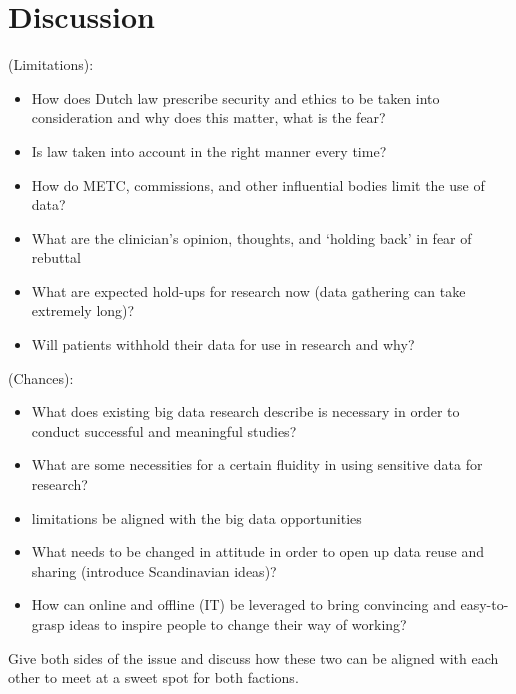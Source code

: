 \section{Discussion}
(Limitations):
\begin{itemize}
	\item How does Dutch law prescribe security and ethics to be taken into consideration and why does this matter, what is the fear?
	\item Is law taken into account in the right manner every time?
	\item How do METC, commissions, and other influential bodies limit the use of data?
	\item What are the clinician's opinion, thoughts, and `holding back' in fear of rebuttal
	\item What are expected hold-ups for research now (data gathering can take extremely long)?
	\item Will patients withhold their data for use in research and why?
\end{itemize}
(Chances):
\begin{itemize}
	\item What does existing big data research describe is necessary in order to conduct successful and meaningful studies?
	\item What are some necessities for a certain fluidity in using sensitive data for research?
	\item {} limitations be aligned with the big data opportunities
	\item What needs to be changed in attitude in order to open up data reuse and sharing (introduce Scandinavian ideas)?
	\item How can online and offline (IT) be leveraged to bring convincing and easy-to-grasp ideas to inspire people to change their way of working?
\end{itemize}
Give both sides of the issue and discuss how these two can be aligned with each other to meet at a sweet spot for both factions.